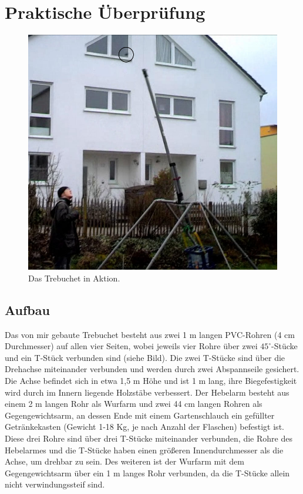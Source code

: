 \chapter{Praktische Überprüfung}

\begin{figure}[h!]
    \includegraphics[width=\textwidth]{bilder/tech}
    \caption{Das Trebuchet in Aktion.}
\end{figure}

\section{Aufbau}
Das von mir gebaute Trebuchet besteht aus zwei 1 m langen PVC-Rohren (4 cm Durchmesser) auf allen vier Seiten, wobei jeweils vier Rohre über zwei $45^\circ$-Stücke und ein T-Stück verbunden sind (siehe Bild).  Die zwei T-Stücke sind über die Drehachse miteinander verbunden und werden durch zwei Abspannseile gesichert. Die Achse befindet sich in etwa 1,5 m Höhe und ist 1 m lang, ihre Biegefestigkeit wird durch im Innern liegende Holzstäbe verbessert. Der Hebelarm besteht aus einem 2 m langen Rohr als Wurfarm und zwei 44 cm langen Rohren als Gegengewichtsarm, an dessen Ende mit einem Gartenschlauch ein gefüllter Getränkekasten (Gewicht 1-18 Kg, je nach Anzahl der Flaschen) befestigt ist. Diese drei Rohre sind über drei T-Stücke miteinander verbunden, die Rohre des Hebelarmes und die T-Stücke haben einen größeren Innendurchmesser als die Achse, um drehbar zu sein. Des weiteren ist der Wurfarm mit dem Gegengewichtsarm über ein 1 m langes Rohr verbunden, da die T-Stücke allein nicht verwindungssteif sind.

